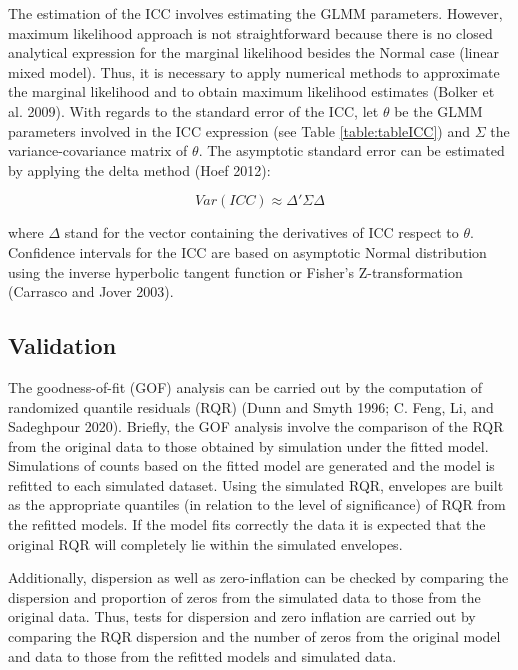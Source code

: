 The estimation of the ICC involves estimating the GLMM parameters. However, maximum likelihood approach is not straightforward because there is no closed analytical expression for the marginal likelihood besides the Normal case (linear mixed model). Thus, it is necessary to apply numerical methods to approximate the marginal likelihood and to obtain maximum likelihood estimates (Bolker et al. 2009).
With regards to the standard error of the ICC, let \(\theta\) be the GLMM parameters involved in the ICC expression (see Table \ref{table:tableICC}) and \(\Sigma\) the variance-covariance matrix of \(\theta\). The asymptotic standard error can be estimated by applying the delta method (Hoef 2012):

\begin{equation}
Var\left(ICC\right) \approx \Delta'\Sigma\Delta
\label{eq:varicc}
\end{equation}

where \(\Delta\) stand for the vector containing the derivatives of ICC respect to \(\theta\). Confidence intervals for the ICC are based on asymptotic Normal distribution using the inverse hyperbolic tangent function or Fisher's Z-transformation (Carrasco and Jover 2003).

\hypertarget{validation}{%
\subsection{Validation}\label{validation}}

The goodness-of-fit (GOF) analysis can be carried out by the computation of randomized quantile residuals (RQR) (Dunn and Smyth 1996; C. Feng, Li, and Sadeghpour 2020). Briefly, the GOF analysis involve the comparison of the RQR from the original data to those obtained by simulation under the fitted model. Simulations of counts based on the fitted model are generated and the model is refitted to each simulated dataset. Using the simulated RQR, envelopes are built as the appropriate quantiles (in relation to the level of significance) of RQR from the refitted models. If the model fits correctly the data it is expected that the original RQR will completely lie within the simulated envelopes.

Additionally, dispersion as well as zero-inflation can be checked by comparing the dispersion and proportion of zeros from the simulated data to those from the original data. Thus, tests for dispersion and zero inflation are carried out by comparing the RQR dispersion and the number of zeros from the original model and data to those from the refitted models and simulated data.


